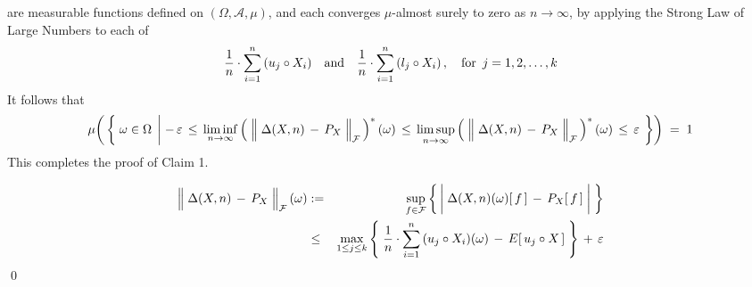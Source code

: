 are measurable functions defined on $(\Omega,\mathcal{A},\mu)$, and
each converges $\mu$-almost surely to zero as $n \longrightarrow \infty$,
by applying the Strong Law of Large Numbers to each of
\begin{equation*}
\dfrac{1}{n}\cdot \overset{n}{\underset{i=1}{\sum}}\,(u_{j} \circ X_{i})
\quad\textnormal{and}\quad
\dfrac{1}{n}\cdot \overset{n}{\underset{i=1}{\sum}}\,(l_{j} \circ X_{i})\,,
\quad\textnormal{for \,$j = 1, 2, \ldots, k$}
\end{equation*}
It follows that
\begin{equation*}
\mu\!\left(\,\left\{\;
	\omega\in\Omega
\;\left\vert\;
	-\,\varepsilon
	\,\leq\,
	\underset{n\rightarrow\infty}{\liminf}
	\left(\;\left\Vert\;\Delta(X,n) \,\overset{{\color{white}.}}{-}\, P_{X}\;\right\Vert_{\mathcal{F}}\,\right)^{*}(\omega)
	\,\leq\,
	\underset{n\rightarrow\infty}{\limsup}
	\left(\;\left\Vert\;\Delta(X,n) \,\overset{{\color{white}.}}{-}\, P_{X}\;\right\Vert_{\mathcal{F}}\,\right)^{*}(\omega)
	\,\leq\,
	\varepsilon
\right.
\;\right\}\right)
\;=\; 1
\end{equation*}
This completes the proof of Claim 1.


\begin{eqnarray*}
\left\Vert\;\Delta(X,n) \,\overset{{\color{white}.}}{-}\, P_{X}\;\right\Vert_{\mathcal{F}}(\omega)
& := &
	\underset{f\in\mathcal{F}}{\sup}\left\{\,
		\left\vert\; \Delta(X,n)(\omega)[\,f\,]\,\overset{{\color{white}+}}{-}\,P_{X}[\,f\,] \;\right\vert
	\;\right\}
\\
& \leq &
	\underset{1\leq j \leq k}{\max}\left\{\;
		\dfrac{1}{n}\cdot \overset{n}{\underset{i=1}{\sum}}\,(u_{j} \circ X_{i})(\omega)
		\,\overset{{\color{white}+}}{-}\,
		E[\,u_{j} \circ X\,]
		\;\right\}
	\,\overset{{\color{white}+}}{+}\,
	\varepsilon
\end{eqnarray*}
\qed



\renewcommand{\theenumi}{\roman{enumi}}
\renewcommand{\labelenumi}{\textnormal{(\theenumi)}$\;\;$}

